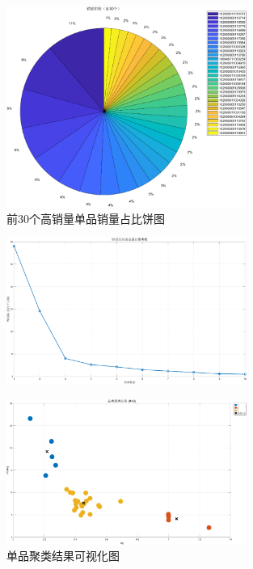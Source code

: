 \documentclass{MathNoteCN}
\begin{document}
\begin{figure}[H]
    \centering
    \includegraphics[width=0.7\textwidth]{销量饼图(前30个).png} 
    \caption{前30个高销量单品销量占比饼图}
\end{figure}

\begin{figure}[H]
    \centering
    \includegraphics[width=0.7\textwidth]{聚类肘部图.png}
\end{figure}

\begin{figure}[H]
    \centering
    \includegraphics[width=0.7\textwidth]{聚类结果可视化.png}
    \caption{单品聚类结果可视化图}
\end{figure}
\end{document}
